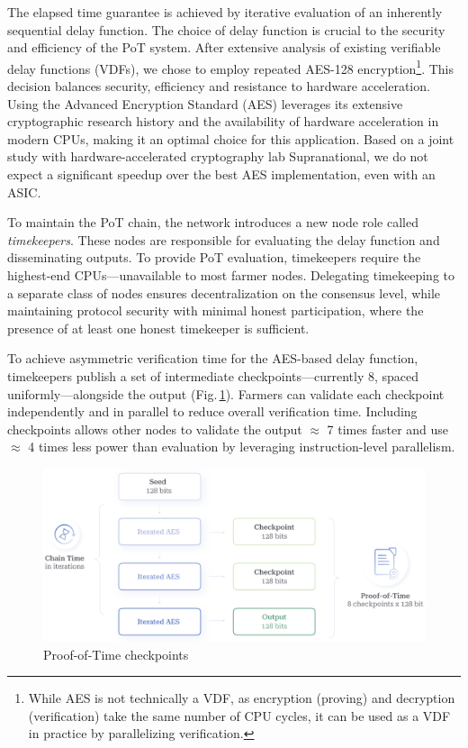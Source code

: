 \documentclass[conference]{IEEEtran}
\begin{document}
The elapsed time guarantee is achieved by iterative evaluation of an inherently sequential delay function. The choice of delay function is crucial to the security and efficiency of the PoT system. After extensive analysis of existing verifiable delay functions (VDFs), we chose to employ repeated AES-128 encryption\footnote{While AES is not technically a VDF, as encryption (proving) and decryption (verification) take the same number of CPU cycles, it can be used as a VDF in practice by parallelizing verification.}. This decision balances security, efficiency and resistance to hardware acceleration. Using the Advanced Encryption Standard (AES) leverages its extensive cryptographic research history and the availability of hardware acceleration in modern CPUs, making it an optimal choice for this application. Based on a joint study with hardware-accelerated cryptography lab Supranational, we do not expect a significant speedup over the best AES implementation, even with an ASIC.

To maintain the PoT chain, the network introduces a new node role called \textit{timekeepers}. These nodes are responsible for evaluating the delay function and disseminating outputs. To provide PoT evaluation, timekeepers require the highest-end CPUs—unavailable to most farmer nodes. Delegating timekeeping to a separate class of nodes ensures decentralization on the consensus level, while maintaining protocol security with minimal honest participation, where the presence of at least one honest timekeeper is sufficient.

To achieve asymmetric verification time for the AES-based delay function, timekeepers publish a set of intermediate checkpoints—currently 8, spaced uniformly—alongside the output (Fig.\,\ref{fig:pot}). Farmers can validate each checkpoint independently and in parallel to reduce overall verification time. Including checkpoints allows other nodes to validate the output $\approx $ 7 times faster and use $\approx$ 4 times less power than evaluation by leveraging instruction-level parallelism.
\begin{figure}
    \centering
    \includegraphics[width=1\linewidth]{proof-of-time.png}
\caption{Proof-of-Time checkpoints}
\label{fig:pot}
\end{figure}
\end{document}
